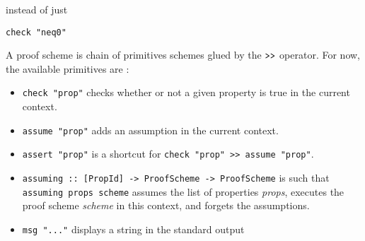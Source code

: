 instead of just 
\begin{lstlisting}[frame=single] 
  check "neq0" 
\end{lstlisting}
A proof scheme is chain of
primitives schemes glued by the $\texttt{\textgreater{}\textgreater{}}$
operator. For now, the available primitives are :

\begin{itemize}
\itemsep1pt\parskip0pt
\item
  \texttt{check "prop"} checks whether or not a given property is true
  in the current context.
\item
  \texttt{assume "prop"} adds an assumption in the current context.
\item
  \texttt{assert "prop"} is a shortcut for
  \texttt{check "prop" \textgreater{}\textgreater{} assume "prop"}.
\item
  \texttt{assuming :: {[}PropId{]} -\textgreater{} ProofScheme -\textgreater{} ProofScheme}
  is such that \texttt{assuming props scheme} assumes the list of
  properties \emph{props}, executes the proof scheme \emph{scheme} in
  this context, and forgets the assumptions.
\item
  \texttt{msg "..."} displays a string in the standard output
\end{itemize}
